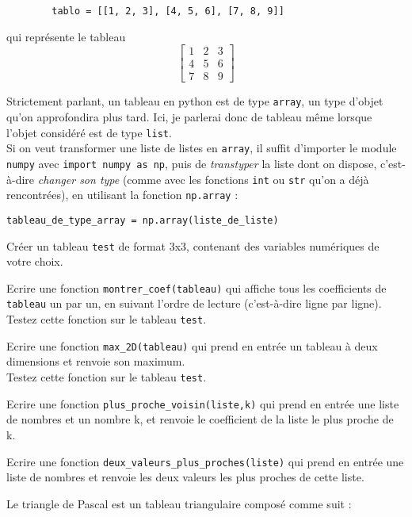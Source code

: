 	\begin{verbatim}
        tablo = [[1, 2, 3], [4, 5, 6], [7, 8, 9]]
    \end{verbatim}

	qui représente le tableau \[
		\begin{bmatrix}
			1 & 2 & 3 \\
			4 & 5 & 6 \\
			7 & 8 & 9
		\end{bmatrix}
	\]


	Strictement parlant, un tableau en python est de type \texttt{array}, un type d'objet qu'on approfondira plus tard. Ici, je parlerai donc de tableau même lorsque l'objet considéré est de type \texttt{list}. \\
	Si on veut transformer une liste de listes en \texttt{array}, il suffit d'importer le module \texttt{numpy} avec \texttt{import numpy as np}, puis de \textit{transtyper} la liste dont on dispose, c'est-à-dire \textit{changer son type} (comme avec les fonctions \texttt{int} ou \texttt{str} qu'on a déjà rencontrées), en utilisant la fonction \texttt{np.array} :

	\texttt{tableau\_de\_type\_array = np.array(liste\_de\_liste)}

\ssques Créer un tableau \texttt{test} de format 3x3, contenant des variables numériques de votre choix.

\ssques Ecrire une fonction \texttt{montrer\_coef(tableau)} qui affiche tous les coefficients de \texttt{tableau} un par un, en suivant l'ordre de lecture (c'est-à-dire ligne par ligne). \\
Testez cette fonction sur le tableau \texttt{test}.

\ssques Ecrire une fonction \texttt{max\_2D(tableau)} qui prend en entrée un tableau à deux dimensions et renvoie son maximum. \\
Testez cette fonction sur le tableau \texttt{test}.

\quessques Ecrire une fonction \texttt{plus\_proche\_voisin(liste,k)} qui prend en entrée une liste de nombres et un nombre k, et renvoie le coefficient de la liste le plus proche de k.

\ssques Ecrire une fonction \texttt{deux\_valeurs\_plus\_proches(liste)} qui prend en entrée une liste de nombres et renvoie les deux valeurs les plus proches de cette liste.



Le triangle de Pascal est un tableau triangulaire composé comme suit :

